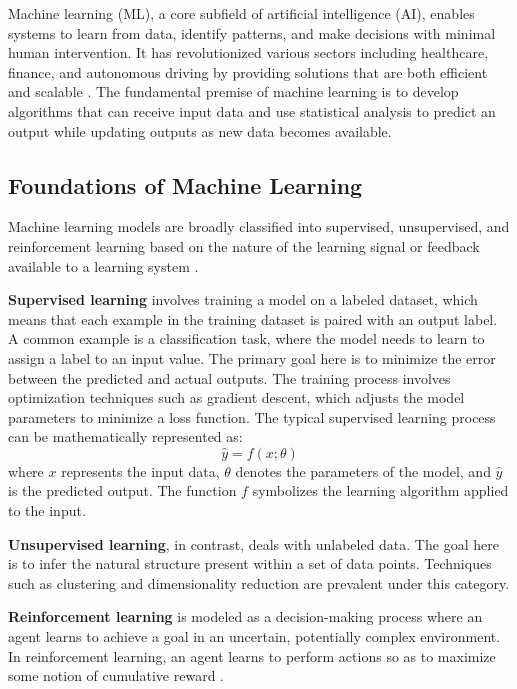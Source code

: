 Machine learning (ML), a core subfield of artificial intelligence (AI), enables systems to learn from data, identify patterns, and make decisions with minimal human intervention. It has revolutionized various sectors including healthcare, finance, and autonomous driving by providing solutions that are both efficient and scalable \cite{Jordan2015Machine, Goodfellow2016Deep}. The fundamental premise of machine learning is to develop algorithms that can receive input data and use statistical analysis to predict an output while updating outputs as new data becomes available.

\subsection*{Foundations of Machine Learning}
Machine learning models are broadly classified into supervised, unsupervised, and reinforcement learning based on the nature of the learning signal or feedback available to a learning system \cite{Sutton2018Reinforcement}. 

\textbf{Supervised learning} involves training a model on a labeled dataset, which means that each example in the training dataset is paired with an output label. A common example is a classification task, where the model needs to learn to assign a label to an input value. The primary goal here is to minimize the error between the predicted and actual outputs. The training process involves optimization techniques such as gradient descent, which adjusts the model parameters to minimize a loss function. The typical supervised learning process can be mathematically represented as:
\begin{equation}
    \hat{y} = f(x; \theta)
\end{equation}
where \( x \) represents the input data, \( \theta \) denotes the parameters of the model, and \( \hat{y} \) is the predicted output. The function \( f \) symbolizes the learning algorithm applied to the input.

\textbf{Unsupervised learning}, in contrast, deals with unlabeled data. The goal here is to infer the natural structure present within a set of data points. Techniques such as clustering and dimensionality reduction are prevalent under this category. 

\textbf{Reinforcement learning} is modeled as a decision-making process where an agent learns to achieve a goal in an uncertain, potentially complex environment. In reinforcement learning, an agent learns to perform actions so as to maximize some notion of cumulative reward \cite{Sutton2018Reinforcement}.

